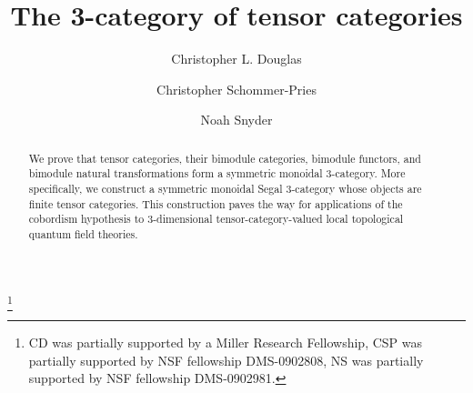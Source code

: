 \documentclass{amsart}
\begin{document}
\title{The 3-category of tensor categories}

\begin{abstract}
We prove that tensor categories, their bimodule categories, bimodule functors, and bimodule natural transformations form a symmetric monoidal $3$-category.  More specifically, we construct a symmetric monoidal Segal $3$-category whose objects are finite tensor categories.  This construction paves the way for applications of the cobordism hypothesis to $3$-dimensional tensor-category-valued local topological quantum field theories.
\end{abstract}
	
\author{Christopher L. Douglas}
\address{Mathematical Institute\\ University of Oxford\\ Oxford OX1 3LB\\ United Kingdom}
      	
\author{Christopher Schommer-Pries}
\address{Department of Mathematics\\ Massachusetts Institute of Technology\\ Cambridge, MA 02139\\ USA}

\author{Noah Snyder}
\address{Department of Mathematics\\ Columbia University\\ New York, NY 10027\\ USA}

\thanks{CD was partially supported by a Miller Research Fellowship, CSP was partially supported by NSF fellowship DMS-0902808,  NS was partially supported by NSF fellowship DMS-0902981.
}

\maketitle
\end{document}
